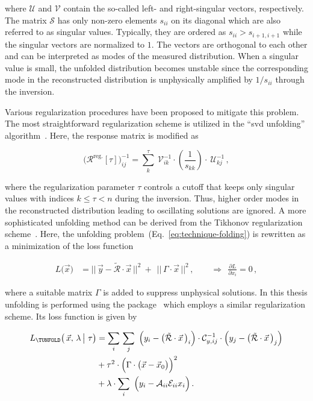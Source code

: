 where $\mathcal{U}$ and $\mathcal{V}$ contain the so-called left- and right-singular vectors, respectively. The matrix $\mathcal{S}$ has only non-zero elements $s_{ii}$ on its diagonal which are also referred to as singular values. Typically, they are ordered as $s_{ii}>s_{i+1,i+1}$ while the singular vectors are normalized to $1$. The vectors are orthogonal to each other and can be interpreted as modes of the measured distribution. When a singular value is small, the unfolded distribution becomes unstable since the corresponding mode in the reconstructed distribution is unphysically amplified by $1/s_{ii}$ through the inversion.

Various regularization procedures have been proposed to mitigate this problem. The most straightforward regularization scheme is utilized in the ``\gls{svd} unfolding'' algorithm~\cite{Hocker:1995kb}. Here, the response matrix is modified as

\begin{equation}
\Big(\mathcal{R}^\mathrm{reg.}[\tau]\Big)^{-1}_{ ij}=\sum_{k}^{\tau}~\mathcal{V}^{-1}_{ik}\cdot\left(\frac{1}{s_{kk}}\right)\cdot~\mathcal{U}^{-1}_{kj}\,,
\end{equation}

where the regularization parameter $\tau$ controls a cutoff that keeps only singular values with indices $k\leq\tau<n$ during the inversion. Thus, higher order modes in the reconstructed distribution leading to oscillating solutions are ignored. A more sophisticated unfolding method can be derived from the Tikhonov regularization scheme~\cite{Tikhonov}. Here, the unfolding problem~(Eq.~\ref{eq:technique-folding}) is rewritten as a minimization of the loss function

\begin{align}
L\big(\vec{x}\big)&=\big|\big|\,\vec{y}-\tilde{\mathcal{R}}\cdot\vec{x} \,\big|\big|^{2}~+~~\big|\big|\,\Gamma\cdot\vec{x}\,\big|\big|^{2}\,,\qquad\Rightarrow~~\frac{\partial L}{\partial x_{i}}=0\,,
\end{align}

where a suitable matrix $\Gamma$ is added to suppress unphysical solutions. In this thesis unfolding is performed using the \TUNFOLD[format=hyperbf] package~\cite{1748-0221-7-10-T10003} which employs a similar regularization scheme. Its loss function is given by

\begin{subequations}\label{eq:technique-tunfold}
\begin{align}
L_\mathrm{\TUNFOLD}\big(\,\vec{x},\,\lambda\,\big|~\tau\big)&=\sum_{i}\,\sum_{j}~\Big(y_{i}-\big(\tilde{\mathcal{R}}\cdot\vec{x}\,\big)_{i}\Big)\cdot\mathcal{C}_{y,ij}^{-1}\cdot\Big(y_{j}-\big(\tilde{\mathcal{R}}\cdot\vec{x}\,\big)_{j}\Big)\label{eq:technique-tunfold-response}\\
&+\tau^{2}\cdot\Big(\Gamma\cdot\big(\vec{x}-\vec{x}_{0}\big)\Big)^{2}\label{eq:technique-tunfold-regularization}\\
&+\lambda\cdot\sum_{i}~\Big(y_{i}-\mathcal{A}_{ii}\mathcal{E}_{ii}x_{i}\Big)\,. \label{eq:technique-tunfold-efficiency}
\end{align}
\end{subequations}


